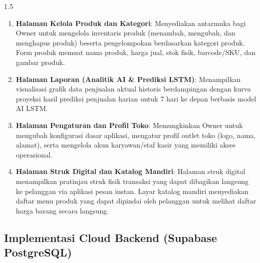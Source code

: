 \documentclass[12pt, a4paper, onecolumn, oneside]{report}
\begin{document}
\begin{spacing}{1.5}
\begin{enumerate}
    \item \textbf{Halaman Kelola Produk dan Kategori}:
    Menyediakan antarmuka bagi Owner untuk mengelola inventaris produk (menambah, mengubah, dan menghapus produk) beserta pengelompokan berdasarkan kategori produk. Form produk memuat nama produk, harga jual, stok fisik, barcode/SKU, dan gambar produk.
    
    \item \textbf{Halaman Laporan (Analitik AI \& Prediksi LSTM)}:
    Menampilkan visualisasi grafik data penjualan aktual historis berdampingan dengan kurva proyeksi hasil prediksi penjualan harian untuk 7 hari ke depan berbasis model AI LSTM.
    
    \item \textbf{Halaman Pengaturan dan Profil Toko}:
    Memungkinkan Owner untuk mengubah konfigurasi dasar aplikasi, mengatur profil outlet toko (logo, nama, alamat), serta mengelola akun karyawan/staf kasir yang memiliki akses operasional.
    
    \item \textbf{Halaman Struk Digital dan Katalog Mandiri}:
    Halaman struk digital menampilkan pratinjau struk fisik transaksi yang dapat dibagikan langsung ke pelanggan via aplikasi pesan instan. Layar katalog mandiri menyediakan daftar menu produk yang dapat dipindai oleh pelanggan untuk melihat daftar harga barang secara langsung.
\end{enumerate}

\subsection{Implementasi Cloud Backend (Supabase PostgreSQL)}


\end{spacing}
\end{document}
